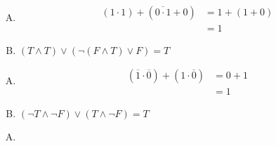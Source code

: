 {{        %
        \begin{practices}
            \begin{enumerate}[A.]
                \item
                {
                    \begin{align*}
                        (1 \cdot 1) + (\overline{0 \cdot 1} + 0)
                        &= 1 + (1 + 0) \\
                        &= 1
                    \end{align*}
                }
                \item
                {
                    $(T \wedge T) \vee (\neg (F \wedge T) \vee F) = T$
                }
            \end{enumerate}
        \end{practices}

        \begin{practices}
            \begin{enumerate}[A.]
                \item
                {
                    \begin{align*}
                        (\overline{1} \cdot \overline{0}) + (1 \cdot \overline{0})
                        &= 0 + 1 \\
                        &= 1
                    \end{align*}
                }
                \item
                {
                    $(\neg T \wedge \neg F) \vee (T \wedge \neg F) = T$
                }
            \end{enumerate}
        \end{practices}

        \begin{practices}
            \begin{enumerate}[A.]
                \item
                {
                    \begin{table}[H]
                        \centering


\end{table}}
\end{enumerate}
\end{practices}}}
